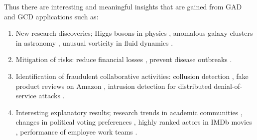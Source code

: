  Thus there are interesting and meaningful insights that are gained from GAD and GCD applications such as: 
\begin{enumerate}
\item  New research discoveries; 
Higgs bosons in physics \cite{OCSMM}, 
 anomalous galaxy clusters in astronomy  \cite{SMDD},  unusual vorticity in fluid dynamics \cite{FGM}. 
\item  Mitigation of risks: reduce financial losses  \cite{GLETS}, prevent disease outbreaks  \cite{wong-rule}.
\item   Identification of  fraudulent collaborative  activities:  collusion detection \cite{Chile}, fake product reviews on Amazon  \cite{GroupReviewSpam}, %
 intrusion detection for  distributed denial-of-service attacks  \cite{chen2016collaborative}.   
\item  Interesting  explanatory results;   research trends in academic communities   \cite{GLAD},  changes in political voting preferences \cite{GLAD},  
highly ranked actors in IMDb movies   \cite{ERACD}, performance of employee work teams  \cite{kozlowski2003}.  
\end{enumerate}  

   
